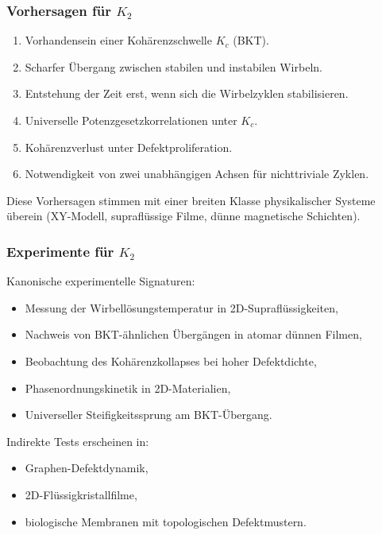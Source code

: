 \subsubsection{Vorhersagen für \texorpdfstring{$K_2$}{K_2}}

\begin{enumerate}
    \item Vorhandensein einer Kohärenzschwelle $K_c$ (BKT).
    \item Scharfer Übergang zwischen stabilen und instabilen Wirbeln.
    \item Entstehung der Zeit erst, wenn sich die Wirbelzyklen stabilisieren.
    \item Universelle Potenzgesetzkorrelationen unter $K_c$.
    \item Kohärenzverlust unter Defektproliferation.
    \item Notwendigkeit von zwei unabhängigen Achsen für nichttriviale Zyklen.
\end{enumerate}

Diese Vorhersagen stimmen mit einer breiten Klasse physikalischer Systeme überein (XY-Modell,
supraflüssige Filme, dünne magnetische Schichten).

\subsubsection{Experimente für \texorpdfstring{$K_2$}{K_2}}

Kanonische experimentelle Signaturen:
\begin{itemize}
    \item Messung der Wirbellösungstemperatur in 2D-Supraflüssigkeiten,
    \item Nachweis von BKT-ähnlichen Übergängen in atomar dünnen Filmen,
    \item Beobachtung des Kohärenzkollapses bei hoher Defektdichte,
    \item Phasenordnungskinetik in 2D-Materialien,
    \item Universeller Steifigkeitssprung am BKT-Übergang.
\end{itemize}

Indirekte Tests erscheinen in:
\begin{itemize}
    \item Graphen-Defektdynamik,
    \item 2D-Flüssigkristallfilme,
    \item biologische Membranen mit topologischen Defektmustern.
\end{itemize}

